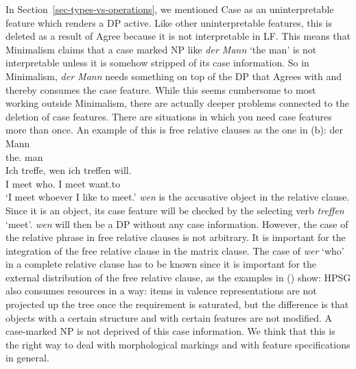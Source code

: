 \documentclass[output=paper
                ,modfonts
                ,nonflat
	        ,collection
	        ,collectionchapter
	        ,collectiontoclongg
 	        ,biblatex
                ,babelshorthands
                ,newtxmath
                ,draftmode
                ,colorlinks, citecolor=brown
]{./langsci/langscibook}
\begin{document}
In Section~\ref{sec-types-vs-operations}, we mentioned Case as an uninterpretable feature which
renders a DP active. Like other uninterpretable features, this is deleted as a result of Agree
because it is not interpretable in LF. 
This means that Minimalism claims
that a case marked NP like \emph{der Mann} `the man' is not interpretable unless it is somehow
stripped of its case information.
So in Minimalism, \emph{der Mann} needs something on top of the DP
that Agrees with and thereby consumes the case feature. While this seems cumbersome to most working outside Minimalism,
there are actually deeper problems connected to the deletion of case features. There are
situations in which you need case features more than once. An example of this is free relative
clauses as the one in (b):
\eal
\ex 
\gll der Mann\\
     the.\nom{} man\\
\ex
\gll Ich treffe, wen ich treffen will.\\
     I meet who.\acc{} I meet want.to\\
\glt `I meet whoever I like to meet.'
\zl
\emph{wen} is the accusative object in the relative clause. Since it is an object, its case feature
will be checked by the selecting verb \emph{treffen} `meet'. \emph{wen} will then be a DP without
any case information. However, the case of the relative phrase in free relative clauses is not
arbitrary. It is important for the integration of the free relative clause in the matrix clause. The
case of \emph{wer} `who' in a complete relative clause has to be known since it is important for the
external distribution of the free relative clause, as the examples in () show:
\eal
{}
\zl
HPSG also consumes resources in a way: items in valence representations are not projected up the
tree once the requirement is saturated, but the difference is that objects with a certain structure
and with certain features are not modified. A case-marked NP is not deprived of this case
information. We think that this is the right way to deal with morphological
markings and with feature specifications in general.
\end{document}
